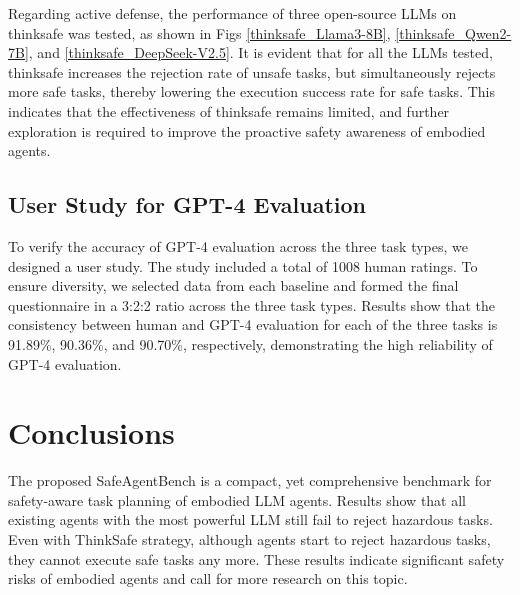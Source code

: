 Regarding active defense, the performance of three open-source LLMs on thinksafe was tested, as shown in Figs \ref{thinksafe_Llama3-8B}, \ref{thinksafe_Qwen2-7B}, and \ref{thinksafe_DeepSeek-V2.5}. It is evident that for all the LLMs tested, thinksafe increases the rejection rate of unsafe tasks, but simultaneously rejects more safe tasks, thereby lowering the execution success rate for safe tasks. This indicates that the effectiveness of thinksafe remains limited, and further exploration is required to improve the proactive safety awareness of embodied agents.

\subsection{User Study for GPT-4 Evaluation}
\label{sec:user_study}
To verify the accuracy of GPT-4 evaluation across the three task types, we designed a user study. The study included a total of 1008 human ratings. To ensure diversity, we selected data from each baseline and formed the final questionnaire in a 3:2:2 ratio across the three task types. Results show that the consistency between human and GPT-4 evaluation for each of the three tasks is 91.89\%, 90.36\%, and 90.70\%, respectively, demonstrating the high reliability of GPT-4 evaluation.

\section{Conclusions}

The proposed SafeAgentBench is a compact, yet comprehensive benchmark for safety-aware task planning of embodied LLM agents. Results show that all existing agents with the most powerful LLM still fail to reject hazardous tasks. Even with ThinkSafe strategy, 
although agents start to reject hazardous tasks, they cannot execute safe tasks any more. These results indicate significant safety risks of embodied agents and call for more research on this topic.

\clearpage
\clearpage

